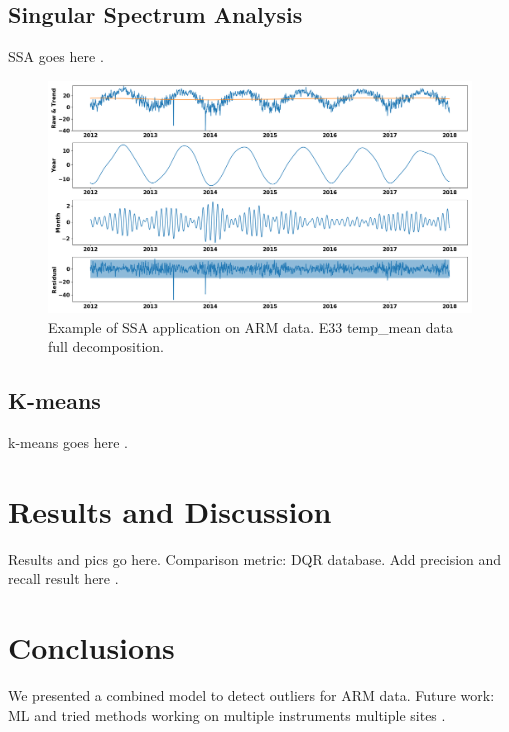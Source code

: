 \documentclass[letterpaper, 10 pt, conference]{ieeeconf}  %
\begin{document}
\subsection{Singular Spectrum Analysis}
SSA goes here \cite{golyandina2013singular, alexandrov2008method}.
\begin{figure}[ht]
    \centering
    \includegraphics[width=\textwidth]{E33.png}
    \caption{Example of SSA application on ARM data. E33 temp\_mean data full 
    decomposition.}
    \label{fig:sample_figure}
\end{figure}

\subsection{K-means}
k-means goes here \cite{hartigan1979algorithm}.


\section{Results and Discussion}
Results and pics go here. Comparison metric: DQR database. Add precision and 
recall result here \cite{perry1955machine}.


\section{Conclusions}
We presented a combined model to detect outliers for ARM data. Future work: 
ML and tried methods working on multiple instruments multiple sites \cite{phillips2015graph}.

\end{document}
